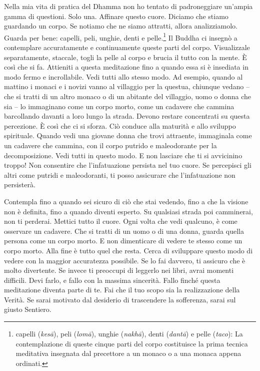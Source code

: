 Nella mia vita di pratica del Dhamma non ho tentato di padroneggiare
un'ampia gamma di questioni. Solo una. Affinare questo cuore. Diciamo
che stiamo guardando un corpo. Se notiamo che ne siamo attratti, allora
analizziamolo. Guarda per bene: capelli, peli, unghie, denti e
pelle.\footnote{capelli (\emph{kesā}), peli (\emph{lomā}), unghie
  (\emph{nakhā}), denti (\emph{dantā}) e pelle (\emph{taco}): La
  contemplazione di queste cinque parti del corpo costituisce la prima
  tecnica meditativa insegnata dal precettore a un monaco o a una monaca
  appena ordinati.} Il Buddha ci insegnò a contemplare accuratamente e
continuamente queste parti del corpo. Visualizzale separatamente,
staccale, togli la pelle al corpo e brucia il tutto con la mente. È così
che si fa. Attieniti a questa meditazione fino a quando essa si è
insediata in modo fermo e incrollabile. Vedi tutti allo stesso modo. Ad
esempio, quando al mattino i monaci e i novizi vanno al villaggio per la
questua, chiunque vedano -- che si tratti di un altro monaco o di un
abitante del villaggio, uomo o donna che sia -- lo immaginano come un
corpo morto, come un cadavere che cammina barcollando davanti a loro
lungo la strada. Devono restare concentrati su questa percezione. È così
che ci si sforza. Ciò conduce alla maturità e allo sviluppo spirituale.
Quando vedi una giovane donna che trovi attraente, immaginala come un
cadavere che cammina, con il corpo putrido e maleodorante per la
decomposizione. Vedi tutti in questo modo. E non lasciare che ti si
avvicinino troppo! Non consentire che l'infatuazione persista nel tuo
cuore. Se percepisci gli altri come putridi e maleodoranti, ti posso
assicurare che l'infatuazione non persisterà.

Contempla fino a quando sei sicuro di ciò che stai vedendo, fino a che
la visione non è definita, fino a quando diventi esperto. Su qualsiasi
strada poi camminerai, non ti perderai. Mettici tutto il cuore. Ogni
volta che vedi qualcuno, è come osservare un cadavere. Che si tratti di
un uomo o di una donna, guarda quella persona come un corpo morto. E non
dimenticare di vedere te stesso come un corpo morto. Alla fine è tutto
quel che resta. Cerca di sviluppare questo modo di vedere con la maggior
accuratezza possibile. Se lo fai davvero, ti assicuro che è molto
divertente. Se invece ti preoccupi di leggerlo nei libri, avrai momenti
difficili. Devi farlo, e fallo con la massima sincerità. Fallo finché
questa meditazione diventa parte di te. Fai che il tuo scopo sia la
realizzazione della Verità. Se sarai motivato dal desiderio di
trascendere la sofferenza, sarai sul giusto Sentiero.

